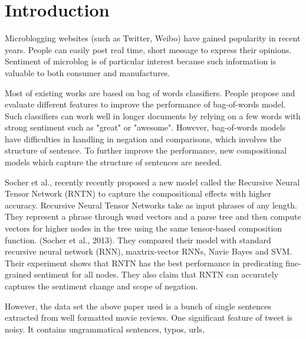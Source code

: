 \section{Introduction}

Microblogging websites (such as Twitter, Weibo) have gained popularity in recent years. People can easily post real time, short message to express their opinions. 
Sentiment of microblog is of particular interest because such information is valuable to both consumer and
manufactures.

Most of existing works are based on bag of words classifiers. People propose and evaluate different features to improve the performance of bag-of-words model. Such classifiers can work well in longer documents by relying on a few words with strong sentiment such as "great" or "awesome". However, bag-of-words models have difficulties in handling in negation and comparisons, which involves the structure of sentence. To further improve the performance, new compositional models which capture the structure of sentences are needed. 

Socher et al., recently recently proposed a new model called the Recursive Neural Tensor Network (RNTN) to capture the compositional effects with higher accuracy. 
Recursive Neural Tensor Networks take as input phrases of any length. 
They represent a phrase through word vectors and a parse tree and then compute vectors for higher nodes in the tree using the same tensor-based composition function. (Socher et al., 2013). They compared their model with standard recursive neural network (RNN), maxtrix-vector RNNs, Navie Bayes and SVM. Their experiment shows that RNTN has the best performance in predicating fine-grained sentiment for all nodes. They also claim that RNTN can accurately captures the sentiment change and scope of negation. 

However, the data set the above paper used is a bunch of single sentences extracted from well formatted movie reviews.  One significant feature of tweet is noisy. It contains ungrammatical sentences, typos, urls, 